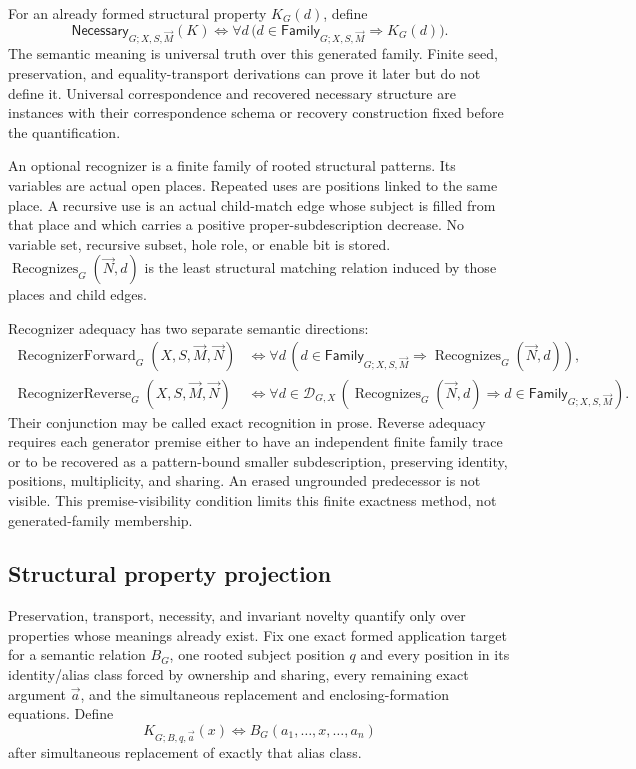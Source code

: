 \documentclass[11pt,twoside]{article}
\newcommand{\Family}{\mathsf{Family}}
\newcommand{\Necessary}{\mathsf{Necessary}}
\begin{document}
For an already formed structural property \(K_G(d)\), define
\[
  \Necessary_{G;X,S,\vec M}(K)
  \Longleftrightarrow
  \forall d\,
  \bigl(d\in\Family_{G;X,S,\vec M}\Longrightarrow K_G(d)\bigr).
\]
The semantic meaning is universal truth over this generated family.  Finite seed,
preservation, and equality-transport derivations can prove it later but do not
define it.  Universal correspondence and recovered necessary structure are
instances with their correspondence schema or recovery construction fixed before
the quantification.

An optional recognizer is a finite family of rooted structural patterns.  Its
variables are actual open places.  Repeated uses are positions linked to the same
place.  A recursive use is an actual child-match edge whose subject is filled from
that place and which carries a positive proper-subdescription decrease.  No
variable set, recursive subset, hole role, or enable bit is stored.
\(\operatorname{Recognizes}_G(\vec N,d)\) is the least structural matching relation
induced by those places and child edges.

Recognizer adequacy has two separate semantic directions:
\[
\begin{aligned}
 \operatorname{RecognizerForward}_{G}(X,S,\vec M,\vec N)
 &\Longleftrightarrow
 \forall d\,
   (d\in\Family_{G;X,S,\vec M}
      \Rightarrow\operatorname{Recognizes}_G(\vec N,d)),\\
 \operatorname{RecognizerReverse}_{G}(X,S,\vec M,\vec N)
 &\Longleftrightarrow
 \forall d\in\mathcal D_{G,X}\,
   (\operatorname{Recognizes}_G(\vec N,d)
      \Rightarrow d\in\Family_{G;X,S,\vec M}).
\end{aligned}
\]
Their conjunction may be called exact recognition in prose.  Reverse adequacy
requires each generator premise either to have an independent finite family trace
or to be recovered as a pattern-bound smaller subdescription, preserving identity,
positions, multiplicity, and sharing.  An erased ungrounded predecessor is not
visible.  This premise-visibility condition limits this finite exactness method,
not generated-family membership.

\subsection{Structural property projection}

Preservation, transport, necessity, and invariant novelty quantify only over
properties whose meanings already exist.  Fix one exact formed application target
for a semantic relation \(B_G\), one rooted subject position \(q\) and every
position in its identity/alias class forced by ownership and sharing, every
remaining exact argument \(\vec a\), and the simultaneous replacement and
enclosing-formation equations.  Define
\[
  K_{G;B,q,\vec a}(x)
  \Longleftrightarrow
  B_G(a_1,\ldots,x,\ldots,a_n)
\]
after simultaneous replacement of exactly that alias class.
\end{document}
